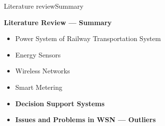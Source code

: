 		
		



\begin{frame}{Literature review}{Summary}
	\begin{block}{\textbf{Literature Review --- Summary}}
		\begin{itemize}
			\item Power System of Railway Transportation System
			\item Energy Sensors
			\item Wireless Networks
			\item Smart Metering
			\item \textbf{Decision Support Systems}
			\item \textbf{Issues and Problems in WSN --- Outliers}
		\end{itemize}
	\end{block}
\end{frame}



	
